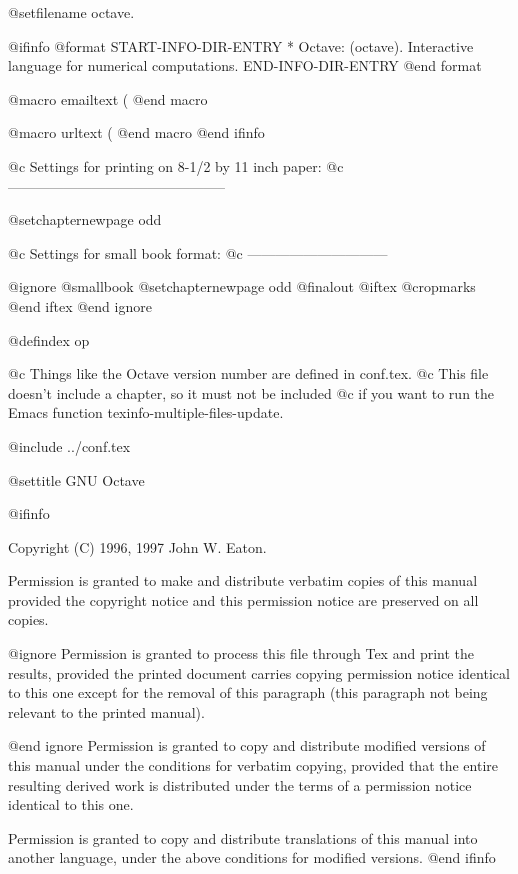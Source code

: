 

@setfilename octave.

@ifinfo
@format
START-INFO-DIR-ENTRY
* Octave: (octave).	Interactive language for numerical computations.
END-INFO-DIR-ENTRY
@end format

@macro email{text}
(\text\)
@end macro

@macro url{text}
(\text\)
@end macro
@end ifinfo

@c Settings for printing on 8-1/2 by 11 inch paper:
@c -----------------------------------------------

@setchapternewpage odd

@c Settings for small book format:
@c ------------------------------

@ignore
@smallbook
@setchapternewpage odd
@finalout
@iftex
@cropmarks
@end iftex
@end ignore

@defindex op

@c Things like the Octave version number are defined in conf.tex.
@c This file doesn't include a chapter, so it must not be included
@c if you want to run the Emacs function texinfo-multiple-files-update.

@include ../conf.tex

@settitle GNU Octave

@ifinfo

Copyright (C) 1996, 1997 John W. Eaton.

Permission is granted to make and distribute verbatim copies of
this manual provided the copyright notice and this permission notice
are preserved on all copies.

@ignore
Permission is granted to process this file through Tex and print the
results, provided the printed document carries copying permission
notice identical to this one except for the removal of this paragraph
(this paragraph not being relevant to the printed manual).

@end ignore
Permission is granted to copy and distribute modified versions of
this manual under the conditions for verbatim copying, provided that
the entire resulting derived work is distributed under the terms of
a permission notice identical to this one.

Permission is granted to copy and distribute translations of this
manual into another language, under the above conditions for
modified versions.
@end ifinfo


